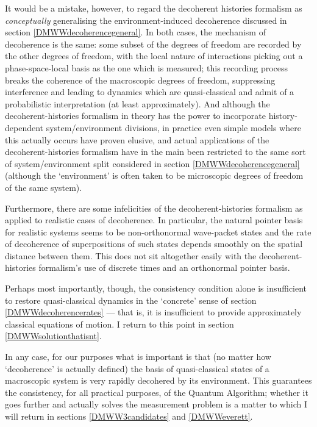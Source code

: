 \documentclass[12pt]{article}
\begin{document}
It would be a mistake, however, to regard the decoherent histories formalism as \emph{conceptually} generalising the environment-induced decoherence discussed in section \ref{DMWWdecoherencegeneral}. In both cases, the mechanism of decoherence is the same: some subset of the degrees of freedom are recorded by the other degrees of freedom, with the local nature of interactions picking out a phase-space-local basis as the one which is measured; this recording process breaks the coherence of the macroscopic degrees of freedom, suppressing interference and leading to dynamics which are quasi-classical  and admit of a probabilistic interpretation (at least approximately). And although the decoherent-histories formalism in theory has the power to incorporate history-dependent system/environment divisions, in practice even simple models where this actually occurs have proven elusive, and actual applications of the decoherent-histories formalism have in the main been restricted to the same sort of system/environment split considered in section \ref{DMWWdecoherencegeneral} (although the `environment' is often taken to be microscopic degrees of freedom of the same system).

Furthermore, there are some infelicities of the decoherent-histories formalism as applied to realistic cases of decoherence. In particular, the natural pointer basis for realistic systems seems to be non-orthonormal wave-packet states and the rate of decoherence of superpositions of such states depends smoothly on the spatial distance between them. This does not sit altogether easily with the decoherent-histories formalism's  use of discrete times and an orthonormal pointer basis. 

Perhaps most importantly, though, the consistency condition alone is insufficient to restore quasi-classical dynamics in the `concrete' sense of section \ref{DMWWdecoherencerates} --- that is, it is insufficient to provide approximately classical equations of motion. I return to this point in section \ref{DMWWsolutionthatisnt}.

In any case, for our purposes what is important is that (no matter how `decoherence' is actually defined)  the basis of quasi-classical states of a macroscopic system is very rapidly decohered by its environment. This guarantees the consistency, for all practical purposes, of the Quantum Algorithm; whether it goes further and actually solves the measurement problem is a matter to which I will return in sections \ref{DMWW3candidates} and \ref{DMWWeverett}. 
\end{document}
